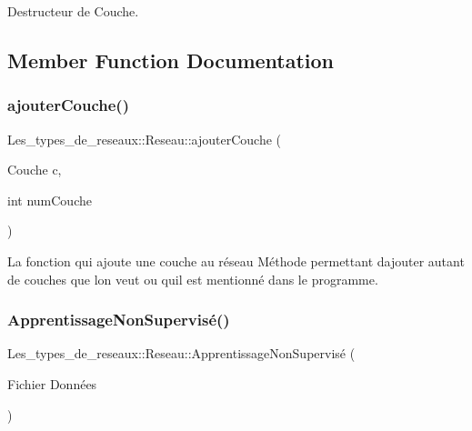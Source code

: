 Destructeur de Couche. 



\subsection{Member Function Documentation}
\mbox{\label{class_les__types__de__reseaux_1_1_reseau_ab254177ffab90f08faa97d7810182049}} 
\subsubsection{\texorpdfstring{ajouter\+Couche()}{ajouterCouche()}}
{\footnotesize\ttfamily Les\+\_\+types\+\_\+de\+\_\+reseaux\+::\+Reseau\+::ajouter\+Couche (\begin{DoxyParamCaption}\item[{Couche}]{c,  }\item[{int}]{num\+Couche }\end{DoxyParamCaption})\hspace{0.3cm}{\ttfamily [protected]}}



La fonction qui ajoute une couche au réseau Méthode permettant d\textquotesingle{}ajouter autant de couches que l\textquotesingle{}on veut ou qu\textquotesingle{}il est mentionné dans le programme. 

\mbox{\label{class_les__types__de__reseaux_1_1_reseau_a71a35e986b54506ca243f3ccb7984fe5}} 
\subsubsection{\texorpdfstring{Apprentissage\+Non\+Supervisé()}{ApprentissageNonSupervisé()}}
{\footnotesize\ttfamily Les\+\_\+types\+\_\+de\+\_\+reseaux\+::\+Reseau\+::\+Apprentissage\+Non\+Supervisé (\begin{DoxyParamCaption}\item[{Fichier}]{Données }\end{DoxyParamCaption})\hspace{0.3cm}{\ttfamily [protected]}}




